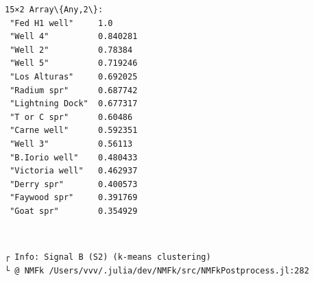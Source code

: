 \documentclass[11pt]{article}
\begin{document}
    \begin{Verbatim}[commandchars=\\\{\}]
15×2 Array\{Any,2\}:
 "Fed H1 well"     1.0
 "Well 4"          0.840281
 "Well 2"          0.78384
 "Well 5"          0.719246
 "Los Alturas"     0.692025
 "Radium spr"      0.687742
 "Lightning Dock"  0.677317
 "T or C spr"      0.60486
 "Carne well"      0.592351
 "Well 3"          0.56113
 "B.Iorio well"    0.480433
 "Victoria well"   0.462937
 "Derry spr"       0.400573
 "Faywood spr"     0.391769
 "Goat spr"        0.354929
    \end{Verbatim}

    
    \begin{center}
    \end{center}
    { \hspace*{\fill} \\}
    
    \begin{Verbatim}[commandchars=\\\{\}]
┌ Info: Signal B (S2) (k-means clustering)
└ @ NMFk /Users/vvv/.julia/dev/NMFk/src/NMFkPostprocess.jl:282
    \end{Verbatim}

    \begin{center}
    \end{center}
    { \hspace*{\fill} \\}
    
    \begin{Verbatim}[commandchars=\\\{\}]

    \end{Verbatim}

    \begin{center}
    \end{center}
    { \hspace*{\fill} \\}
    
    \begin{center}
    \end{center}
    { \hspace*{\fill} \\}
    
\end{document}
